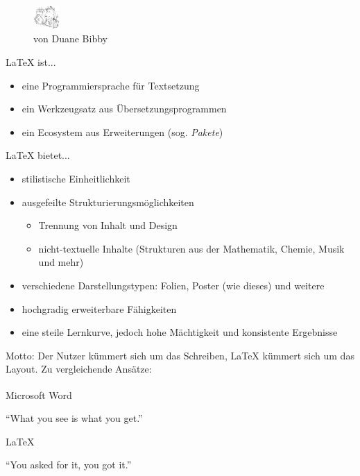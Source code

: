\begin{figure}
	\centering
	\includegraphics*[width=0.09\textwidth]{img/ctan-lion.png}
	\caption*{\hspace{7em}\color{lightgray}\small von Duane Bibby}
	\vspace{-6em}
\end{figure}

\large\LaTeX{} ist...
\begin{itemize}
	\item eine Programmiersprache für Textsetzung
	\item ein Werkzeugsatz aus Übersetzungsprogrammen
	\item ein Ecosystem aus Erweiterungen (sog. \emph{Pakete})
\end{itemize}

\vspace{0.05\linewidth}

\large\LaTeX{} bietet...
\begin{itemize}
	\item stilistische Einheitlichkeit
	\item ausgefeilte Strukturierungsmöglichkeiten
	\begin{itemize}
		\item Trennung von Inhalt und Design
		\item nicht-textuelle Inhalte (Strukturen aus der Mathematik, Chemie, Musik und mehr)
	\end{itemize}
	\item verschiedene Darstellungstypen: Folien, Poster {\color{gray}(wie dieses)} und weitere
	\item hochgradig erweiterbare Fähigkeiten
	\item eine steile Lernkurve, jedoch hohe Mächtigkeit und konsistente Ergebnisse
\end{itemize}

Motto: Der Nutzer kümmert sich um das Schreiben, \LaTeX{} kümmert sich um das Layout.
Zu vergleichende Ansätze:
\setlength{\columnsep}{1cm}
\begin{multicols}{2}
\centering

Microsoft\textsuperscript{\texttrademark} Word

\enquote{What you see is what you get.}

\columnbreak

\LaTeX{}

\enquote{You asked for it, you got it.}

\end{multicols}
